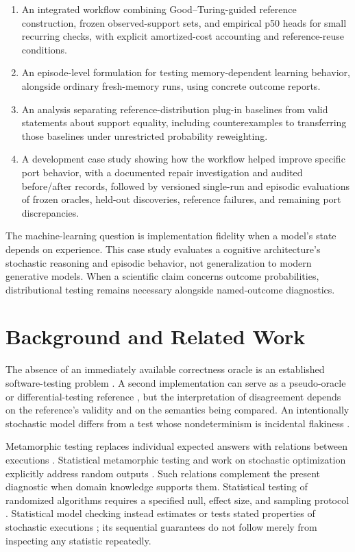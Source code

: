 \documentclass[10pt,letterpaper]{article}
\newcommand{\tightlist}{\setlength{\itemsep}{0pt}\setlength{\parskip}{0pt}}
\begin{document}
\begin{enumerate}
\def\labelenumi{\arabic{enumi}.}
\tightlist
\item
  An integrated workflow combining Good--Turing-guided reference construction, frozen
  observed-support sets, and empirical p50 heads for small recurring checks, with explicit
  amortized-cost accounting and reference-reuse conditions.
\item
  An episode-level formulation for testing memory-dependent learning behavior, alongside
  ordinary fresh-memory runs, using concrete outcome reports.
\item
  An analysis separating reference-distribution plug-in baselines from valid statements
  about support equality, including counterexamples to transferring those baselines under
  unrestricted probability reweighting.
\item
  A development case study showing how the workflow helped improve specific port behavior,
  with a documented repair investigation and audited before/after records, followed by
  versioned single-run and episodic evaluations of frozen oracles, held-out discoveries,
  reference failures, and remaining port discrepancies.
\end{enumerate}

The machine-learning question is implementation fidelity when a model's state depends on
experience. This case study evaluates a cognitive architecture's stochastic reasoning and
episodic behavior, not generalization to modern generative models. When a scientific claim
concerns outcome probabilities, distributional testing remains necessary alongside
named-outcome diagnostics.

\section{Background and Related Work}\label{sec:related}

The absence of an immediately available correctness oracle is an established
software-testing problem \citep{ref1, ref3, ref26}. A second implementation can serve as a
pseudo-oracle \citep{ref2} or differential-testing reference \citep{ref4}, but the
interpretation of disagreement depends on the reference's validity and on the semantics
being compared. An intentionally stochastic model differs from a test whose nondeterminism
is incidental flakiness \citep{ref17}.

Metamorphic testing replaces individual expected answers with relations between executions
\citep{ref7, ref5, ref28}. Statistical metamorphic testing and work on stochastic
optimization explicitly address random outputs \citep{ref6, ref27}. Such relations
complement the present diagnostic when domain knowledge supports them. Statistical testing
of randomized algorithms requires a specified null, effect size, and sampling protocol
\citep{ref31}. Statistical model checking instead estimates or tests stated properties of
stochastic executions \citep{ref15, ref16}; its sequential guarantees do not follow merely
from inspecting any statistic repeatedly.
\end{document}
